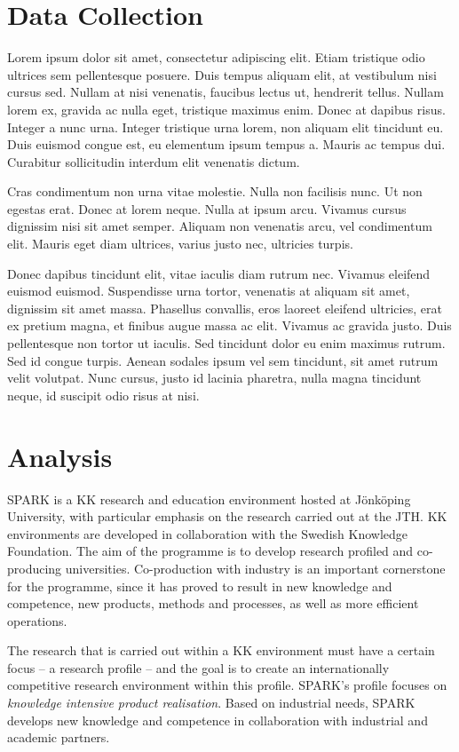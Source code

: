 \documentclass[11pt, a4paper]{JTH}
\begin{document}
\section{Data Collection}

Lorem ipsum dolor sit amet, consectetur adipiscing elit. Etiam tristique odio ultrices sem pellentesque posuere. Duis tempus aliquam elit, at vestibulum nisi cursus sed. Nullam at nisi venenatis, faucibus lectus ut, hendrerit tellus. Nullam lorem ex, gravida ac nulla eget, tristique maximus enim. Donec at dapibus risus. Integer a nunc urna. Integer tristique urna lorem, non aliquam elit tincidunt eu. Duis euismod congue est, eu elementum ipsum tempus a. Mauris ac tempus dui. Curabitur sollicitudin interdum elit venenatis dictum.

Cras condimentum non urna vitae molestie. Nulla non facilisis nunc. Ut non egestas erat. Donec at lorem neque. Nulla at ipsum arcu. Vivamus cursus dignissim nisi sit amet semper. Aliquam non venenatis arcu, vel condimentum elit. Mauris eget diam ultrices, varius justo nec, ultricies turpis.

Donec dapibus tincidunt elit, vitae iaculis diam rutrum nec. Vivamus eleifend euismod euismod. Suspendisse urna tortor, venenatis at aliquam sit amet, dignissim sit amet massa. Phasellus convallis, eros laoreet eleifend ultricies, erat ex pretium magna, et finibus augue massa ac elit. Vivamus ac gravida justo. Duis pellentesque non tortor ut iaculis. Sed tincidunt dolor eu enim maximus rutrum. Sed id congue turpis. Aenean sodales ipsum vel sem tincidunt, sit amet rutrum velit volutpat. Nunc cursus, justo id lacinia pharetra, nulla magna tincidunt neque, id suscipit odio risus at nisi.

\section{Analysis}

SPARK is a KK research and education environment hosted at Jönköping University, with particular emphasis on the research carried out at the JTH. KK environments are developed in collaboration with the Swedish Knowledge Foundation. The aim of the programme is to develop research profiled and co-producing universities. Co-production with industry is an important cornerstone for the programme, since it has proved to result in new knowledge and competence, new products, methods and processes, as well as more efficient operations.

The research that is carried out within a KK environment must have a certain focus – a research profile – and the goal is to create an internationally competitive research environment within this profile. SPARK's profile focuses on \textit{knowledge intensive product realisation}. Based on industrial needs, SPARK develops new knowledge and competence in collaboration with industrial and academic partners.
\end{document}
